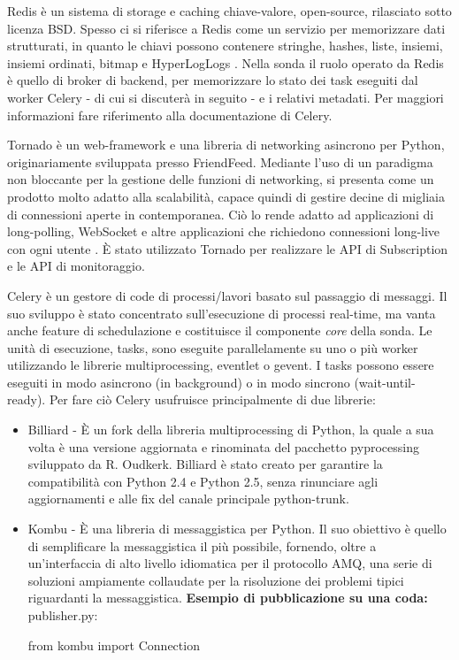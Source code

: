 \documentclass[../main.tex]{subfiles}
\begin{document}
\begin{description}[nolistsep]
\item[Redis]Redis è un sistema di storage e caching chiave-valore, open-source, rilasciato sotto licenza BSD. Spesso ci si riferisce a Redis come un servizio per memorizzare dati strutturati, in quanto le chiavi possono contenere stringhe, hashes, liste, insiemi, insiemi ordinati, bitmap e HyperLogLogs \cite{RedisWebsite}.\newline
Nella sonda il ruolo operato da Redis è quello di broker di backend, per memorizzare lo stato dei task eseguiti dal worker Celery - di cui si discuterà in seguito - e i relativi metadati.
Per maggiori informazioni fare riferimento alla documentazione di Celery.
\item[Tornado]
Tornado è un web-framework e una libreria di networking asincrono per Python, originariamente sviluppata presso FriendFeed.
Mediante l'uso di un paradigma non bloccante per la gestione delle funzioni di networking, si presenta come un prodotto molto adatto alla scalabilità, capace quindi di gestire decine di migliaia di connessioni aperte in contemporanea. Ciò lo rende adatto ad applicazioni di long-polling, WebSocket e altre applicazioni che richiedono connessioni long-live con ogni utente \cite{TornadoWebsite}.\newline
\`E stato utilizzato Tornado per realizzare le API di Subscription e le API di monitoraggio.
\item[Celery]
Celery è un gestore di code di processi/lavori basato sul passaggio di messaggi. Il suo sviluppo è stato concentrato sull'esecuzione di processi real-time, ma vanta anche feature di schedulazione e costituisce il componente \textit{core} della sonda.
Le unità di esecuzione, tasks, sono eseguite parallelamente su uno o più worker utilizzando le librerie multiprocessing, eventlet o gevent.
I tasks possono essere eseguiti in modo asincrono (in background) o in modo sincrono (wait-until-ready).
Per fare ciò Celery usufruisce principalmente di due librerie:
\begin{itemize}[nolistsep]
\item Billiard - \`E un fork della libreria multiprocessing di Python, la quale a sua volta è una versione aggiornata e rinominata del pacchetto pyprocessing sviluppato da R. Oudkerk.
Billiard è stato creato per garantire la compatibilità con Python 2.4 e Python 2.5, senza rinunciare agli aggiornamenti e alle fix del canale principale python-trunk.
\item Kombu - \`E una libreria di messaggistica per Python. Il suo obiettivo è quello di semplificare la messaggistica il più possibile, fornendo, oltre a un'interfaccia di alto livello idiomatica per il protocollo AMQ, una serie di soluzioni ampiamente collaudate per la risoluzione dei problemi tipici riguardanti la messaggistica.
\newline\newline
\textbf{Esempio di pubblicazione su una coda:}
publisher.py:
\begin{python}
from kombu import Connection


\end{python}
\end{itemize}
\end{description}
\end{document}
